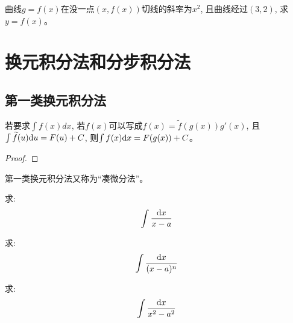 \begin{example}
    曲线$g=f(x)$在没一点$(x, f(x))$切线的斜率为$x^2$, 且曲线经过$(3, 2)$, 求$y = f(x)$。
\end{example}
\begin{solution}
    
\end{solution}

\section{换元积分法和分步积分法}
\subsection{第一类换元积分法}
\begin{theorem}[第一类换元积分法]
    若要求$\int f(x) dx$, 若$f(x)$可以写成$f(x)=\widetilde{f}(g(x))g'(x)$, 且$\int \widetilde{f}(u) \mathrm{d} u = F(u) + C$, 则$\int f(x) \mathrm{d} x = F(g(x)) + C$。    
\end{theorem}
\begin{proof}
    
\end{proof}
\begin{remark}
    第一类换元积分法又称为``凑微分法''。
\end{remark}

\begin{example}
    求:
    \begin{equation*}
        \int \frac{\mathrm{d} x}{x - a}
    \end{equation*}
\end{example}
\begin{solution}
    
\end{solution}

\begin{example}
    求:
    \begin{equation*}
        \int \frac{\mathrm{d} x}{(x-a)^n}
    \end{equation*}
\end{example}
\begin{solution}
    
\end{solution}

\begin{example}
    求:
    \begin{equation*}
        \int \frac{\mathrm{d} x}{x^2 - a^2}
    \end{equation*}
\end{example}
\begin{solution}
    
\end{solution}

